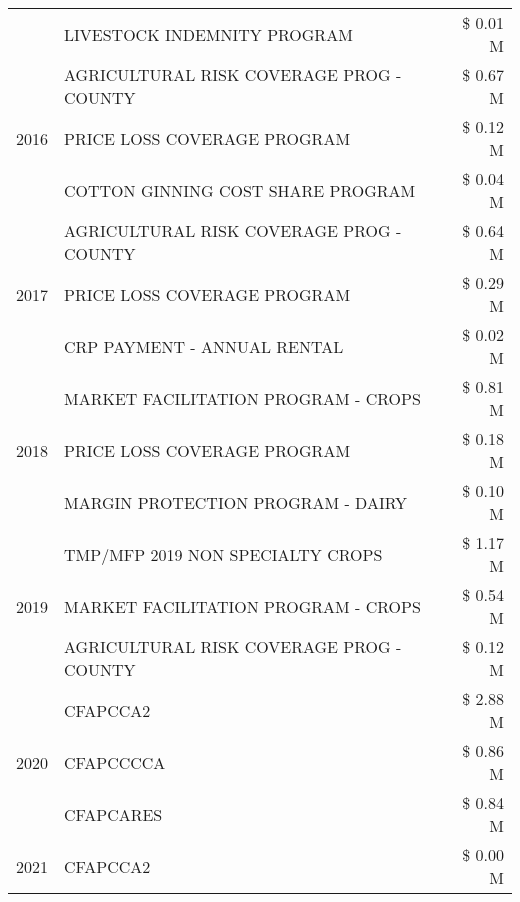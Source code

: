 \begin{tabular}{llr}
 & LIVESTOCK INDEMNITY PROGRAM & \$ 0.01 M \\
\cline{1-3}
\multirow[t]{3}{*}{2016} & AGRICULTURAL RISK COVERAGE PROG - COUNTY & \$ 0.67 M \\
 & PRICE LOSS COVERAGE PROGRAM & \$ 0.12 M \\
 & COTTON GINNING COST SHARE PROGRAM & \$ 0.04 M \\
\cline{1-3}
\multirow[t]{3}{*}{2017} & AGRICULTURAL RISK COVERAGE PROG - COUNTY & \$ 0.64 M \\
 & PRICE LOSS COVERAGE PROGRAM & \$ 0.29 M \\
 & CRP PAYMENT - ANNUAL RENTAL & \$ 0.02 M \\
\cline{1-3}
\multirow[t]{3}{*}{2018} & MARKET FACILITATION PROGRAM - CROPS & \$ 0.81 M \\
 & PRICE LOSS COVERAGE PROGRAM & \$ 0.18 M \\
 & MARGIN PROTECTION PROGRAM - DAIRY & \$ 0.10 M \\
\cline{1-3}
\multirow[t]{3}{*}{2019} & TMP/MFP 2019 NON SPECIALTY CROPS & \$ 1.17 M \\
 & MARKET FACILITATION PROGRAM - CROPS & \$ 0.54 M \\
 & AGRICULTURAL RISK COVERAGE PROG - COUNTY & \$ 0.12 M \\
\cline{1-3}
\multirow[t]{3}{*}{2020} & CFAPCCA2 & \$ 2.88 M \\
 & CFAPCCCCA & \$ 0.86 M \\
 & CFAPCARES & \$ 0.84 M \\
\cline{1-3}
2021 & CFAPCCA2 & \$ 0.00 M \\
\cline{1-3}
\bottomrule
\end{tabular}
